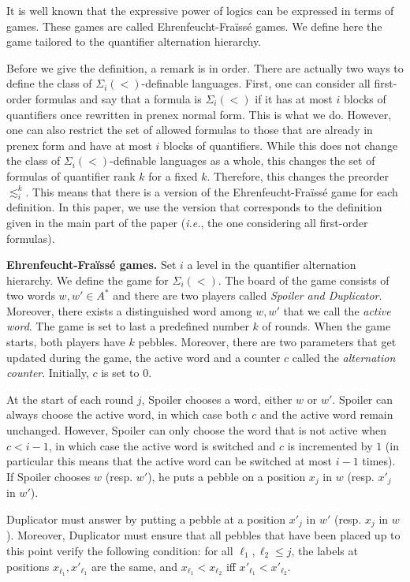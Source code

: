 \documentclass[envcountsame]{llncs}
\newcommand{\efgame}{Ehrenfeucht-Fra\"iss\'e\xspace}
\newcommand{\siw}[1]{\ensuremath{\Sigma_{#1}(<)}\xspace}
\newcommand\sieq[2]{\ensuremath{\lesssim^{#1}_{#2}}\xspace}
\newcommand\ksieq[1]{\sieq{k}{#1}}
\newcommand\lmo{\ensuremath{\leqslant}\xspace}
\begin{document}
It is well known that the expressive power of logics can be
expressed in terms of games. These games are called \efgame games. We
define here the game tailored to the quantifier alternation hierarchy.

Before we give the definition, a remark is in order. There are actually two
ways to define the class of \siw{i}-definable languages.  First, one can
consider all first-order formulas and say that a formula is \siw{i} if it has
at most $i$ blocks of quantifiers once rewritten in prenex normal form. This
is what we do. However, one can also restrict the set of allowed formulas to
those that are already in prenex form and have at most $i$ blocks of
quantifiers. While this does not change the class of \siw{i}-definable
languages as a whole, this changes the set of formulas of quantifier rank $k$
for a fixed $k$. Therefore, this changes the preorder $\ksieq{i}$. This means
that there is a version of the \efgame game for each definition. In this
paper, we use the version that corresponds to the definition given in the
main part of the paper (\emph{i.e.}, the one considering all first-order formulas).

\medskip
\noindent
{\bf \efgame games.} Set $i$ a level in the quantifier alternation
hierarchy. We define the game for \siw{i}. The board of the game
consists of two words $w,w'\in A^*$ and there are two players called
\emph{Spoiler and Duplicator}. Moreover, there exists a
distinguished word among $w,w'$ that we call the \emph{active
  word}. The game is set to last a predefined number $k$ of
rounds. When the game starts, both players have $k$ pebbles. Moreover,
there are two parameters that get updated during the game, the active
word and a counter $c$ called the \emph{alternation counter}. Initially, $c$ is
set to $0$.

At the start of each round $j$, Spoiler chooses a word, either $w$ or
$w'$. Spoiler can always choose the active word, in which case both $c$
and the active word remain unchanged. However, Spoiler can only choose the
word that is not active when $c < i - 1$, in which case the active
word is switched and $c$ is incremented by $1$ (in particular this
means that the active word can be switched at most $i-1$ times). If
Spoiler chooses $w$ (resp. $w'$), he puts a pebble on a position $x_j$ in
$w$ (resp. $x'_j$ in $w'$).

Duplicator must answer by putting a pebble at a position $x'_j$ in
$w'$ (resp. $x_j$ in $w$). Moreover, Duplicator must ensure that all
pebbles that have been placed up to this point verify the following
condition: for all  $\ell_1,\ell_2 \lmo j$, the labels at positions
$x^{}_{\ell_1},x'_{\ell_1}$ are the same, and $x_{\ell_1} < x_{\ell_2}$ iff $x'_{\ell_1} <
x'_{\ell_2}$.  
\end{document}
